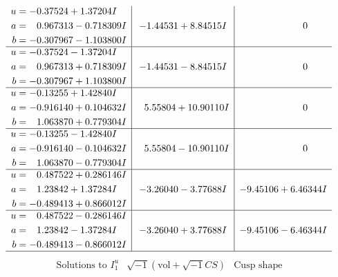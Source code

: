 \documentclass[1p]{elsarticle_modified}
\theoremstyle{definition}
\newcommand{\I}{\sqrt{-1}}
\begin{document}
$$\begin{array}{c|c|c}
\begin{aligned}
u &= -0.37524 + 1.37204 I \\
a &= \phantom{-}0.967313 - 0.718309 I \\
b &= -0.307967 - 1.103800 I\end{aligned}
 & -1.44531 + 8.84515 I & \phantom{-0.000000 } 0 \\ \hline\begin{aligned}
u &= -0.37524 - 1.37204 I \\
a &= \phantom{-}0.967313 + 0.718309 I \\
b &= -0.307967 + 1.103800 I\end{aligned}
 & -1.44531 - 8.84515 I & \phantom{-0.000000 } 0 \\ \hline\begin{aligned}
u &= -0.13255 + 1.42840 I \\
a &= -0.916140 + 0.104632 I \\
b &= \phantom{-}1.063870 + 0.779304 I\end{aligned}
 & \phantom{-}5.55804 + 10.90110 I & \phantom{-0.000000 } 0 \\ \hline\begin{aligned}
u &= -0.13255 - 1.42840 I \\
a &= -0.916140 - 0.104632 I \\
b &= \phantom{-}1.063870 - 0.779304 I\end{aligned}
 & \phantom{-}5.55804 - 10.90110 I & \phantom{-0.000000 } 0 \\ \hline\begin{aligned}
u &= \phantom{-}0.487522 + 0.286146 I \\
a &= \phantom{-}1.23842 + 1.37284 I \\
b &= -0.489413 + 0.866012 I\end{aligned}
 & -3.26040 - 3.77688 I & -9.45106 + 6.46344 I \\ \hline\begin{aligned}
u &= \phantom{-}0.487522 - 0.286146 I \\
a &= \phantom{-}1.23842 - 1.37284 I \\
b &= -0.489413 - 0.866012 I\end{aligned}
 & -3.26040 + 3.77688 I & -9.45106 - 6.46344 I\\
 \hline 
 \end{array}$$\newpage$$\begin{array}{c|c|c}  
\text{Solutions to }I^u_{1}& \I (\text{vol} + \sqrt{-1}CS) & \text{Cusp shape}\\
 \hline 
\begin{aligned}

\end{aligned}
\end{array}$$
\end{document}
